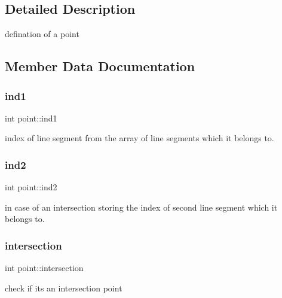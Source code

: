 \subsection{Detailed Description}
defination of a point 

\subsection{Member Data Documentation}
\mbox{\label{structpoint_afe9fd442f02a824cfdd08d51368ad006}} 
\subsubsection{\texorpdfstring{ind1}{ind1}}
{\footnotesize\ttfamily int point\+::ind1}



index of line segment from the array of line segments which it belongs to. 

\mbox{\label{structpoint_ae3ae8dac2b4b5e7b9e05cbf370e43cac}} 
\subsubsection{\texorpdfstring{ind2}{ind2}}
{\footnotesize\ttfamily int point\+::ind2}



in case of an intersection storing the index of second line segment which it belongs to. 

\mbox{\label{structpoint_a510e9106f982be555012f6fdd6b52af4}} 
\subsubsection{\texorpdfstring{intersection}{intersection}}
{\footnotesize\ttfamily int point\+::intersection}



check if it\textquotesingle{}s an intersection point 

\mbox{\label{structpoint_a713fc74a985eeee5f844c324c8d03bfc}} 
